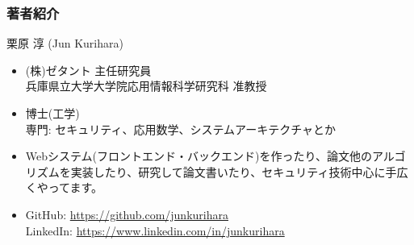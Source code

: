 \begin{frame}
\frametitle{著者紹介}
{\Large 栗原 淳 (Jun Kurihara)}
\begin{itemize}
 \item (株)ゼタント 主任研究員\\
兵庫県立大学大学院応用情報科学研究科 准教授
 \item 博士(工学) \\
 専門: セキュリティ、応用数学、システムアーキテクチャとか
 \item  Webシステム(フロントエンド・バックエンド)を作ったり、論文他のアルゴリズムを実装したり、研究して論文書いたり、セキュリティ技術中心に手広くやってます。
 \item GitHub: \url{https://github.com/junkurihara}\\
LinkedIn: \url{https://www.linkedin.com/in/junkurihara}
\end{itemize}
\end{frame}